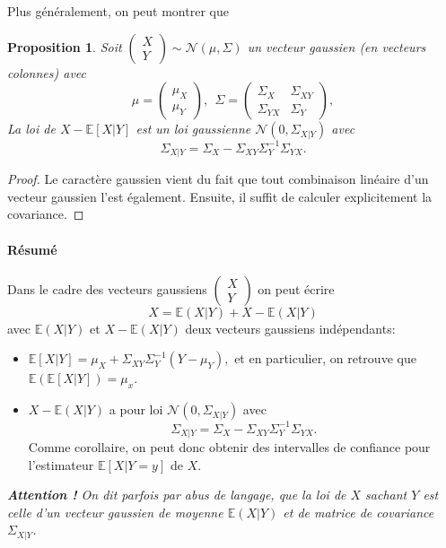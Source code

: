 \documentclass[a4paper,12pt]{book}
\newtheorem{propfr}[thmfr]{Proposition}
\newcommand{\E}{\mathbb{E}}
\begin{document}
Plus généralement, on peut montrer que
\begin{propfr}
Soit  $\left(\begin{array}{c}
X\\
Y
\end{array}\right)\sim\mathcal{N}(\mu,\Sigma)$ un vecteur gaussien (en vecteurs colonnes) avec
$$\mu=\left(\begin{array}{c}
\mu_X\\
\mu_Y
\end{array} \right),\ \ \Sigma=\left(\begin{array}{cc}
\Sigma_X& \Sigma_{XY}\\
\Sigma_{YX}& \Sigma_Y
\end{array}\right), $$
La loi de $X-\mathbb{E}[X|Y]$ est un loi gaussienne $\mathcal{N}(0,\Sigma_{X|Y})$ avec
$$\Sigma_{X|Y}=\Sigma_X-\Sigma_{XY}\Sigma_Y^{-1}\Sigma_{YX}.$$
\end{propfr}

\begin{proof}Le caractère gaussien vient du fait que tout  combinaison linéaire d'un vecteur gaussien l'est également. Ensuite, il suffit de calculer explicitement la covariance.
\end{proof}

\paragraph{Résumé}
Dans le cadre des vecteurs gaussiens $\begin{pmatrix}
X\\Y
\end{pmatrix}$ on peut écrire
\[ X= \E(X\lvert Y) + X-\E(X\lvert Y)\]
avec $\E(X\lvert Y)$ et $X-\E(X\lvert Y)$ deux vecteurs gaussiens indépendants:
\begin{itemize}
\item $\mathbb{E}[X|Y]=\mu_X+\Sigma_{XY}\Sigma_Y^{-1}(Y-\mu_Y),$ et en particulier, on retrouve que $\E(\mathbb{E}[X|Y])=\mu_x$.
\item $X-\E(X\lvert Y)$ a pour loi $\mathcal{N}(0,\Sigma_{X|Y})$ avec
$$\Sigma_{X|Y}=\Sigma_X-\Sigma_{XY}\Sigma_Y^{-1}\Sigma_{YX}.$$
Comme corollaire, on peut donc obtenir des intervalles de confiance pour l'estimateur $\mathbb{E}[X|Y=y]$ de $X$.
\end{itemize}

\textit{
\textbf{Attention !} On dit parfois par abus de langage, que la loi de $X$ sachant $Y$ est celle d'un vecteur gaussien de moyenne $\E(X\lvert Y)$ et de matrice de covariance $\Sigma_{X\lvert Y}$.}
\end{document}
